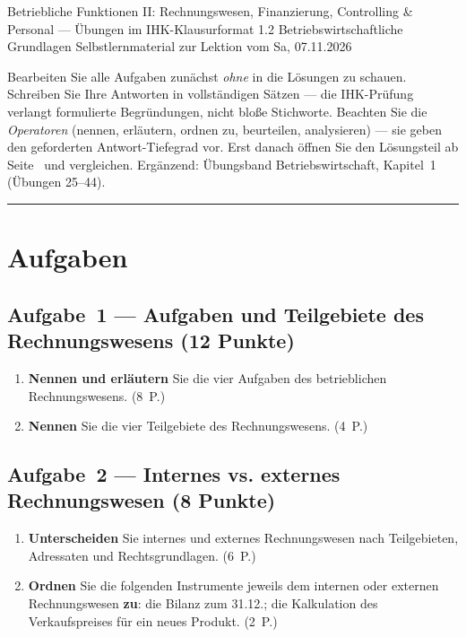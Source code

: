 \documentclass[11pt, a4paper]{article}
\begin{document}
%
  {Betriebliche Funktionen II: Rechnungswesen, Finanzierung, Controlling \& Personal --- Übungen im IHK-Klausurformat}%
  {1.2 Betriebswirtschaftliche Grundlagen}%
  {Selbstlernmaterial zur Lektion vom Sa, 07.11.2026}


\begin{merksatz}[title={\bfseries So nutzen Sie dieses Aufgabenheft}]
Bearbeiten Sie alle Aufgaben zunächst \emph{ohne} in die Lösungen zu schauen. Schreiben
Sie Ihre Antworten in vollständigen Sätzen --- die IHK-Prüfung verlangt formulierte
Begründungen, nicht bloße Stichworte. Beachten Sie die \emph{Operatoren} (nennen,
erläutern, ordnen zu, beurteilen, analysieren) --- sie geben den geforderten
Antwort-Tiefegrad vor. Erst danach öffnen Sie den Lösungsteil ab
Seite~\pageref{loesungen} und vergleichen. Ergänzend: Übungsband Betriebswirtschaft,
Kapitel~1 (Übungen 25--44).
\end{merksatz}

\tableofcontents
\vspace{1em}
\hrule

\section{Aufgaben}

\subsection*{Aufgabe~1 --- Aufgaben und Teilgebiete des Rechnungswesens (12 Punkte)}

\begin{enumerate}[label=(\alph*)]
  \item \textbf{Nennen und erläutern} Sie die vier Aufgaben des betrieblichen
    Rechnungswesens. \hfill (8~P.)
  \item \textbf{Nennen} Sie die vier Teilgebiete des Rechnungswesens. \hfill (4~P.)
\end{enumerate}

\subsection*{Aufgabe~2 --- Internes vs. externes Rechnungswesen (8 Punkte)}

\begin{enumerate}[label=(\alph*)]
  \item \textbf{Unterscheiden} Sie internes und externes Rechnungswesen nach Teilgebieten,
    Adressaten und Rechtsgrundlagen. \hfill (6~P.)
  \item \textbf{Ordnen} Sie die folgenden Instrumente jeweils dem internen oder externen
    Rechnungswesen \textbf{zu}: die Bilanz zum 31.12.; die Kalkulation des Verkaufspreises
    für ein neues Produkt. \hfill (2~P.)
\end{enumerate}
\end{document}
